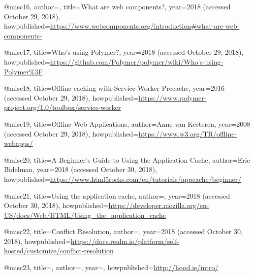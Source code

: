 @misc{16, 
author={},
title={What are web components?},
year={2018 (accessed October 29, 2018)},
howpublished={\url{https://www.webcomponents.org/introduction#what-are-web-components-}}
}

@misc{17,
title={Who's using Polymer?},
year={2018 (accessed October 29, 2018)},
howpublished={\url{https://github.com/Polymer/polymer/wiki/Who's-using-Polymer%3F}}
}

@misc{18,
title={Offline caching with Service Worker Precache},
year={2016 (accessed October 29, 2018)},
howpublished={\url{https://www.polymer-project.org/1.0/toolbox/service-worker}}
}

@misc{19,
title={Offline Web Applications},
author={Anne van Kesteren},
year={2008 (accessed October 29, 2018)},
howpublished={\url{https://www.w3.org/TR/offline-webapps/}}
}

@misc{20,
title={A Beginner's Guide to Using the Application Cache},
author={Eric Bidelman},
year={2018 (accessed October 30, 2018)},
howpublished={\url{https://www.html5rocks.com/en/tutorials/appcache/beginner/}}
}

@misc{21,
title={Using the application cache},
author={},
year={2018 (accessed October 30, 2018)},
howpublished={\url{https://developer.mozilla.org/en-US/docs/Web/HTML/Using_the_application_cache}}
}

@misc{22,
title={Conflict Resolution},
author={},
year={2018 (accessed October 30, 2018)},
howpublished={\url{https://docs.realm.io/platform/self-hosted/customize/conflict-resolution}}
}

@misc{23, 
title={},
author={},
year={},
howpublished={\url{http://hood.ie/intro/}}
}